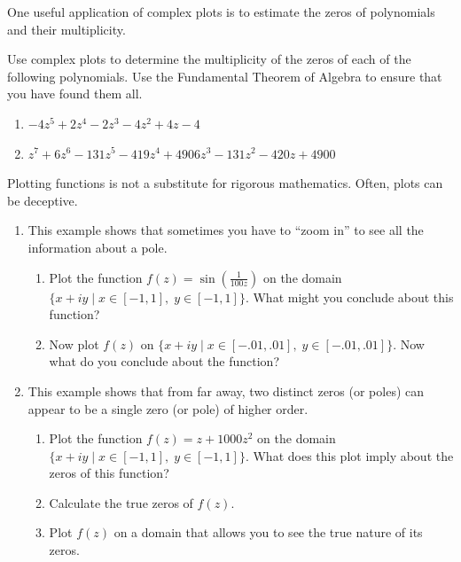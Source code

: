 One useful application of complex plots is to estimate the zeros of polynomials and their multiplicity.

\begin{problem}\label{prob:find_roots}
Use complex plots to determine the multiplicity of the zeros of each of the following polynomials.
Use the Fundamental Theorem of Algebra to ensure that you have found them all.
\begin{enumerate}
\item $-4z^5+2z^4-2z^3-4z^2+4z-4$
\item $z^7 + 6z^6 - 131z^5 - 419z^4 + 4906z^3 - 131z^2 - 420z + 4900$
\end{enumerate}
\end{problem}

Plotting functions is not a substitute for rigorous mathematics.
Often, plots can be deceptive.

\begin{problem}\label{prob:caution}
\leavevmode
\begin{enumerate}
\item This example shows that sometimes you have to ``zoom in'' to see all the information about a pole.
\begin{enumerate}
\item Plot the function $f(z) =\sin( \frac{1}{100z})$ on the domain $\{x+iy \mid x \in [-1,1],\; y \in [-1,1]\}$.
What might you conclude about this function?
\item Now plot $f(z)$ on $\{x+iy \mid x \in [-.01,.01], \; y \in [-.01,.01]\}$.
Now what do you conclude about the function?
\end{enumerate}
\item This example shows that from far away, two distinct zeros (or poles) can appear to be a single zero (or pole) of higher order.
\begin{enumerate}
\item Plot the function $f(z) = z+1000z^2$ on the domain $\{x+iy \mid x \in [-1,1], \; y \in [-1,1]\}$.
What does this plot imply about the zeros of this function?
\item Calculate the true zeros of $f(z)$.
\item Plot $f(z)$ on a domain that allows you to see the true nature of its zeros.
\end{enumerate}
\end{enumerate}
\end{problem}





